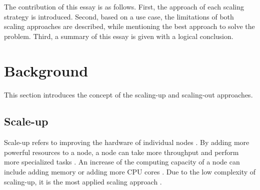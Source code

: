 \documentclass{article}
\begin{document}
The contribution of this essay is as follows. First, the approach of each scaling strategy is introduced. Second, based on a use case, the limitations of both scaling approaches are described, while mentioning the best approach to solve the problem. Third, a summary of this essay is given with a logical conclusion.





\section{Background}

This section introduces the concept of the scaling-up and scaling-out approaches.

\subsection{Scale-up}
Scale-up refers to improving the hardware of individual nodes \cite{Wilder2012CloudPatterns}. By adding more powerful resources to a node, a node can take more throughput and perform more specialized tasks \cite{Abbott2015ScalabilityArt}.
An increase of the computing capacity of a node can include adding memory or adding more CPU cores \cite{Wilder2012CloudPatterns}.
Due to the low complexity of scaling-up, it is the most applied scaling approach \cite{Wilder2012CloudPatterns}.
\end{document}
